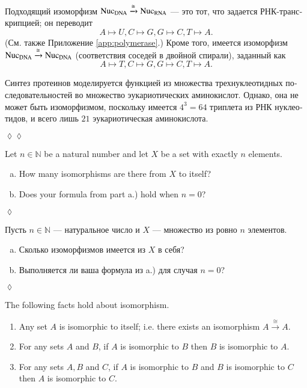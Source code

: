 \documentclass[a4paper]{book}
\def\tn{\textnormal}
\def\NN{{\mathbb N}}
\def\iso{\cong}
\newcommand{\To}[1]{\xrightarrow{#1}}
\theoremstyle{myth}
\newtheorem{lemmaENG}[envENG]{\begin{english}Lemma\end{english}}
\newtheorem{excENG}[envENG]{\begin{english}Exercise\end{english}}
\newenvironment{exerciseENG}{\begin{excENG}}{\hspace*{\fill}$\lozenge$\end{excENG}}
\newtheorem{excRUS}[envRUS]{\begin{russian}Упражнение\end{russian}}
\newtheorem{appRUS}[envRUS]{\begin{russian}Прикладной пример (применение)\end{russian}}
\newenvironment{exerciseRUS}{\begin{excRUS}}{\hspace*{\fill}$\lozenge$\end{excRUS}}
\newenvironment{applicationRUS}{\begin{appRUS}}{\hspace*{\fill}$\lozenge\lozenge$\end{appRUS}}
\def\sexc{\begin{enumerate}[a.)]\setlength{\itemsep}{.1cm}\setlength{\parskip}{.1cm}\item}
\def\next{\item}
\def\endsexc{\end{enumerate}}
\begin{document}
\begin{english}
\begin{applicationRUS}
\begin{russian}Подходящий изоморфизм $\tn{Nuc}_\tn{DNA}\To{\iso}\tn{Nuc}_\tn{RNA}$ — это тот, что задается РНК-транскрипцией; он переводит
$$A\mapsto U, C\mapsto G, G\mapsto C, T\mapsto A.$$ 
(См. также Приложение \ref{app:polymerase}.) Кроме того, имеется изоморфизм $\tn{Nuc}_\tn{DNA}\To{\iso}\tn{Nuc}_\tn{DNA}$ (соответствия соседей в двойной спирали), заданный как  
$$A\mapsto T, C\mapsto G, G\mapsto C, T\mapsto A.$$\end{russian}

\begin{russian}Синтез протеинов моделируется функцией из множества трехнуклеотидных последовательностей во множество эукариотических аминокислот. Однако, она не может быть изоморфизмом, поскольку имеется $4^3=64$ триплета из РНК нуклеотидов, и всего лишь $21$ эукариотическая аминокислота. \end{russian}
\end{applicationRUS}

\begin{exerciseENG}
Let $n\in\NN$ be a natural number and let $X$ be a set with exactly $n$ elements. 
\sexc How many isomorphisms are there from $X$ to itself? 
\next Does your formula from part a.) hold when $n=0$?
\endsexc
\end{exerciseENG}

\begin{exerciseRUS}
\begin{russian}
Пусть $n\in\NN$ — натуральное число и $X$ — множество из ровно $n$ элементов. 
\sexc Сколько изоморфизмов имеется из $X$ в себя? 
\next Выполняется ли ваша формула из a.) для случая $n=0$?
\endsexc 
\end{russian}
\end{exerciseRUS}

\begin{lemmaENG}\label{lemma:isomorphic ER in Set}
The following facts hold about isomorphism.
\begin{enumerate}
\item Any set $A$ is isomorphic to itself; i.e. there exists an isomorphism $A\To{\iso} A$.
\item For any sets $A$ and $B$, if $A$ is isomorphic to $B$ then $B$ is isomorphic to $A$.
\item For any sets $A, B$ and $C$, if $A$ is isomorphic to $B$ and $B$ is isomorphic to $C$ then $A$ is isomorphic to $C$.
\end{enumerate}
\end{lemmaENG}


\end{english}
\end{document}
